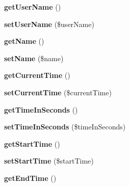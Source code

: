 \begin{DoxyCompactItemize}
\item 
\hypertarget{class_timer_aafd6d1ef27e6acc5833aba4012e5ee77}{{\bfseries get\+User\+Name} ()}\label{class_timer_aafd6d1ef27e6acc5833aba4012e5ee77}

\item 
\hypertarget{class_timer_a20f0087f72763b84d2992ba6ffee2fb2}{{\bfseries set\+User\+Name} (\$user\+Name)}\label{class_timer_a20f0087f72763b84d2992ba6ffee2fb2}

\item 
\hypertarget{class_timer_a3d0963e68bb313b163a73f2803c64600}{{\bfseries get\+Name} ()}\label{class_timer_a3d0963e68bb313b163a73f2803c64600}

\item 
\hypertarget{class_timer_a2fe666694997d047711d7653eca2f132}{{\bfseries set\+Name} (\$name)}\label{class_timer_a2fe666694997d047711d7653eca2f132}

\item 
\hypertarget{class_timer_a67ef180ed8d69dc63dacd27f4a418edd}{{\bfseries get\+Current\+Time} ()}\label{class_timer_a67ef180ed8d69dc63dacd27f4a418edd}

\item 
\hypertarget{class_timer_a8d5094a79f0f135a4ca099db012a3187}{{\bfseries set\+Current\+Time} (\$current\+Time)}\label{class_timer_a8d5094a79f0f135a4ca099db012a3187}

\item 
\hypertarget{class_timer_a009e5d1024e31957e0f239adf4970d9f}{{\bfseries get\+Time\+In\+Seconds} ()}\label{class_timer_a009e5d1024e31957e0f239adf4970d9f}

\item 
\hypertarget{class_timer_a2d169f1a3197de33f59e0c3107c97441}{{\bfseries set\+Time\+In\+Seconds} (\$time\+In\+Seconds)}\label{class_timer_a2d169f1a3197de33f59e0c3107c97441}

\item 
\hypertarget{class_timer_a568a7fafd601b520ff8c4bd91c962e29}{{\bfseries get\+Start\+Time} ()}\label{class_timer_a568a7fafd601b520ff8c4bd91c962e29}

\item 
\hypertarget{class_timer_a797d94d075103364029853d502987afd}{{\bfseries set\+Start\+Time} (\$start\+Time)}\label{class_timer_a797d94d075103364029853d502987afd}

\item 
\hypertarget{class_timer_a553a46d707ec3e83965c44c41f449f68}{{\bfseries get\+End\+Time} ()}\label{class_timer_a553a46d707ec3e83965c44c41f449f68}


\end{DoxyCompactItemize}
